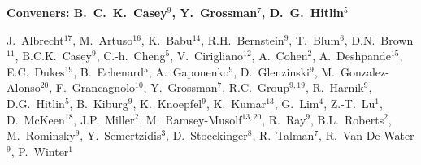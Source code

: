 

\begin{center}

\begin{large} {\bf Conveners: B.~C.~K.~Casey$^{9}$, Y.~Grossman$^{7}$, D.~G.~Hitlin$^{5}$} \end{large}

J.~Albrecht$^{17}$, 
M.~Artuso$^{16}$, 
K.~Babu$^{14}$,
R.H.~Bernstein$^{9}$,
T.~Blum$^{6}$,
D.N.~Brown$^{11}$, 
B.C.K.~Casey$^{9}$,
C.-h.~Cheng$^{5}$,
V.~Cirigliano$^{12}$,
A.~Cohen$^{2}$,
A.~Deshpande$^{15}$,
E.C.~Dukes$^{19}$, 
B.~Echenard$^{5}$,
A.~Gaponenko$^{9}$,
D.~Glenzinski$^{9}$,
M.~Gonzalez-Alonso$^{20}$, 
F.~Grancagnolo$^{10}$,
Y.~Grossman$^{7}$,
R.C.~Group$^{9,19}$,
R.~Harnik$^{9}$,
D.G.~Hitlin$^{5}$, 
B.~Kiburg$^{9}$,
K.~Knoepfel$^{9}$,
K.~Kumar$^{13}$,
G.~Lim$^{4}$,
Z.-T.~Lu$^{1}$,
D.~McKeen$^{18}$,
J.P.~Miller$^{2}$,
M.~Ramsey-Musolf$^{13,20}$, 
R.~Ray$^{9}$,
B.L.~Roberts$^{2}$,
M.~Rominsky$^{9}$,
Y.~Semertzidis$^{3}$,
D.~Stoeckinger$^{8}$,
R.~Talman$^{7}$,
R.~Van De Water$^{9}$,
P.~Winter$^{1}$ 


\end{center}




